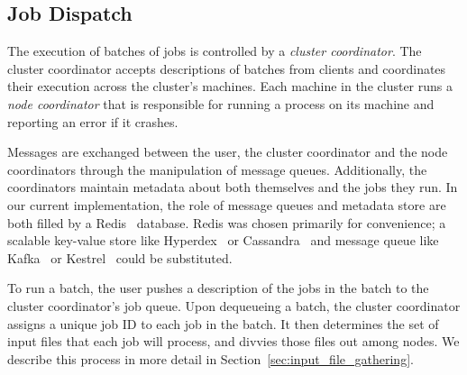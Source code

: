 \subsection{Job Dispatch}
\label{sec:control_plane}

The execution of batches of jobs is controlled by a \emph{cluster
  coordinator}. The cluster coordinator accepts descriptions of batches from
clients and coordinates their execution across the cluster's machines. Each
machine in the cluster runs a \emph{node coordinator} that is responsible for
running a \themis process on its machine and reporting an error if it crashes.

Messages are exchanged between the user, the cluster coordinator and the node
coordinators through the manipulation of message queues. Additionally, the
coordinators maintain metadata about both themselves and the jobs they run. In
our current implementation, the role of message queues and metadata store are
both filled by a Redis~\cite{redis} database. Redis was chosen primarily for
convenience; a scalable key-value store like Hyperdex~\cite{hyperdex} or
Cassandra~\cite{cassandra} and message queue like Kafka~\cite{kafka} or
Kestrel~\cite{kestrel} could be substituted.

To run a batch, the user pushes a description of the jobs in the batch to the
cluster coordinator's job queue. Upon dequeueing a batch, the cluster
coordinator assigns a unique job ID to each job in the batch. It then determines
the set of input files that each job will process, and divvies those files out
among nodes. We describe this process in more detail in
Section~\ref{sec:input_file_gathering}.
